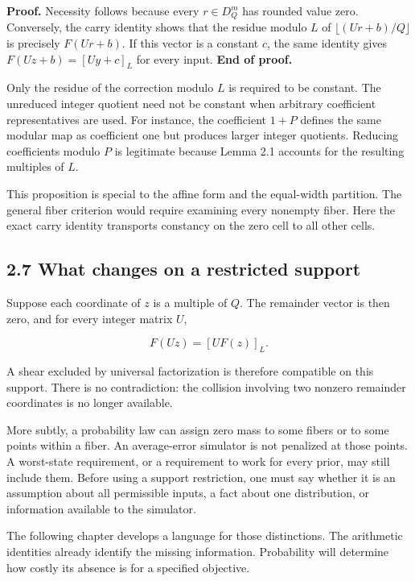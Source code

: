 \documentclass[
]{article}
\begin{document}
\textbf{Proof.} Necessity follows because every \(r\in D_Q^m\) has
rounded value zero. Conversely, the carry identity shows that the
residue modulo \(L\) of \(\lfloor(Ur+b)/Q\rfloor\) is precisely
\(F(Ur+b)\). If this vector is a constant \(c\), the same identity gives
\(F(Uz+b)=[Uy+c]_L\) for every input. \textbf{End of proof.}

Only the residue of the correction modulo \(L\) is required to be
constant. The unreduced integer quotient need not be constant when
arbitrary coefficient representatives are used. For instance, the
coefficient \(1+P\) defines the same modular map as coefficient one but
produces larger integer quotients. Reducing coefficients modulo \(P\) is
legitimate because Lemma 2.1 accounts for the resulting multiples of
\(L\).

This proposition is special to the affine form and the equal-width
partition. The general fiber criterion would require examining every
nonempty fiber. Here the exact carry identity transports constancy on
the zero cell to all other cells.

\subsection{2.7 What changes on a restricted
support}\label{what-changes-on-a-restricted-support}

Suppose each coordinate of \(z\) is a multiple of \(Q\). The remainder
vector is then zero, and for every integer matrix \(U\),

\[
F(Uz)=[UF(z)]_L.
\]

A shear excluded by universal factorization is therefore compatible on
this support. There is no contradiction: the collision involving two
nonzero remainder coordinates is no longer available.

More subtly, a probability law can assign zero mass to some fibers or to
some points within a fiber. An average-error simulator is not penalized
at those points. A worst-state requirement, or a requirement to work for
every prior, may still include them. Before using a support restriction,
one must say whether it is an assumption about all permissible inputs, a
fact about one distribution, or information available to the simulator.

The following chapter develops a language for those distinctions. The
arithmetic identities already identify the missing information.
Probability will determine how costly its absence is for a specified
objective.
\end{document}
